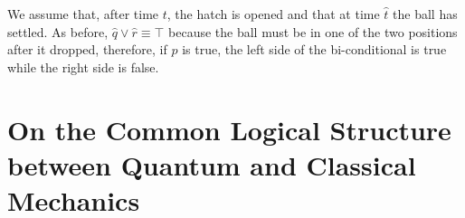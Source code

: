 \documentclass[11pt, executivepaper]{article}
\begin{document}
We assume that, after time $t$, the hatch is opened and that at time $\hat{t}$ the ball has settled. As before, $\hat{q} \vee \hat{r} \equiv \top$ because the ball must be in one of the two positions after it dropped, therefore, if $p$ is true, the left side of the bi-conditional is true while the right side is false.

%
%
%
%
%
%
%
%
%

\section{On the Common Logical Structure between Quantum and Classical Mechanics}
\label{Math}
\end{document}
